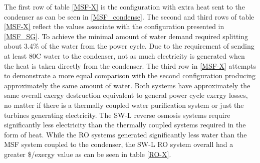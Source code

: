  The first row of table \ref{MSF-X} is the configuration with extra heat sent to the condenser as can be seen in \ref{MSF_condense}.  The second and third rows of table \ref{MSF-X} reflect the values associate with the configuration presented in \ref{MSF_SG}. To achieve the minimal amount of water demand required splitting about 3.4\% of the water from the power cycle. Due to the requirement of sending at least 80\degree C water to the condenser, not as much electricity is generated when the heat is taken directly from the condenser. The third row in \ref{MSF-X} attempts to demonstrate a more equal comparison with the second configuration producing approximately the same amount of water. Both systems have approximately the same overall exergy destruction equivalent to general power cycle exergy losses, no matter if there is a thermally coupled water purification system or just the turbines generating electricity.   The SW-L reverse osmosis systems require significantly less electricity than the thermally coupled systems required in the form of heat.  While the RO systems generated significantly less water than the MSF system coupled to the condenser, the SW-L RO system overall had a greater \$/exergy value as can be seen in table \ref{RO-X}.

